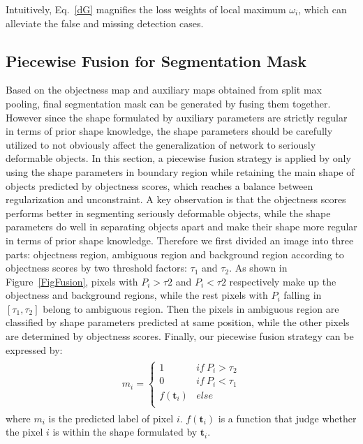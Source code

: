 Intuitively, Eq.~\ref{dG} magnifies the loss weights of local maximum $\omega_{i}$, which can alleviate the false and missing detection cases.

\subsection{Piecewise Fusion for Segmentation Mask}
\label{sec:fusion}
Based on the objectness map and auxiliary maps obtained from split max pooling, final segmentation mask can be generated by fusing them together.
However since the shape formulated by auxiliary parameters are strictly regular in terms of prior shape knowledge, the shape parameters should be carefully utilized to not obviously affect the generalization of network to seriously deformable objects.
In this section, a piecewise fusion strategy is applied by only using the shape parameters in boundary region while retaining the main shape of objects predicted by objectness scores, which reaches a balance between regularization and unconstraint.
A key observation is that the objectness scores performs better in segmenting seriously deformable objects, while the shape parameters do well in separating objects apart and make their shape more regular in terms of prior shape knowledge.
Therefore we first divided an image into three parts: objectness region, ambiguous region and background region according to objectness scores by two threshold factors: $\tau_1$ and $\tau_2$.
As shown in Figure~\ref{FigFusion}, pixels with $P_i>\tau2$ and $P_i<\tau2$ respectively make up the objectness and background regions, while the rest pixels with $P_i$ falling in $[\tau_1, \tau_2]$ belong to ambiguous region.
Then the pixels in ambiguous region are classified by shape parameters predicted at same position, while the other pixels are determined by objectness scores.
Finally, our piecewise fusion strategy can be expressed by:
\begin{eqnarray}\label{fusion}
\begin{aligned}
m_i=\left\{\begin{array}{cc}
1&if~P_i>\tau_2\\
0&if~P_i<\tau_1\\
f(\mathbf{t}_i)&else\\
\end{array}\right.
\end{aligned}
\end{eqnarray}
where $m_i$ is the predicted label of pixel $i$.
$f(\mathbf{t}_i)$ is a function that judge whether the pixel $i$ is within the shape formulated by $\mathbf{t}_i$.
